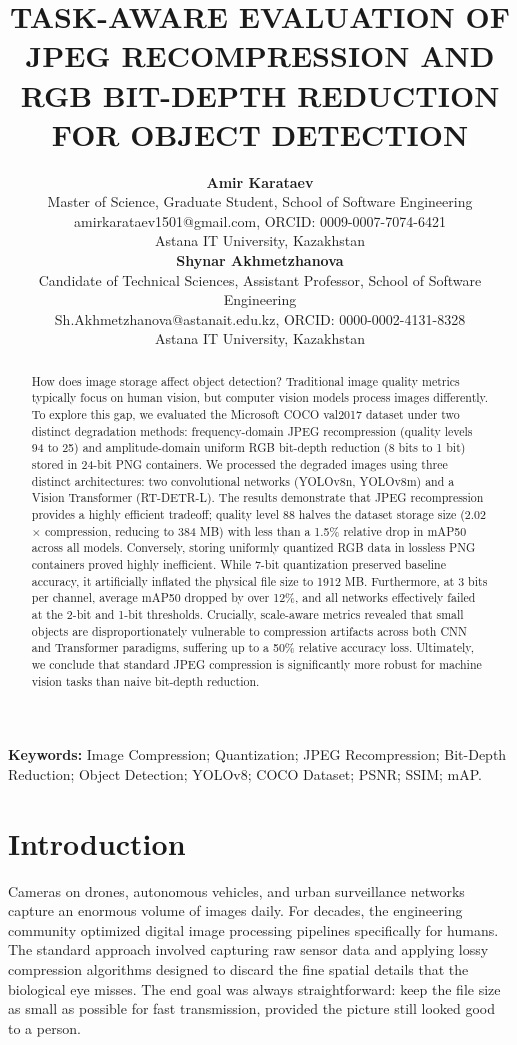 \documentclass[12pt, a4paper]{article}
\title{TASK-AWARE EVALUATION OF JPEG RECOMPRESSION AND RGB BIT-DEPTH REDUCTION FOR OBJECT DETECTION}
\author{
  \textbf{Amir Karataev} \\
  \small Master of Science, Graduate Student, School of Software Engineering \\
  \small amirkarataev1501@gmail.com, ORCID: 0009-0007-7074-6421 \\
  \small Astana IT University, Kazakhstan \\
  \textbf{Shynar Akhmetzhanova} \\
  \small Candidate of Technical Sciences, Assistant Professor, School of Software Engineering \\
  \small Sh.Akhmetzhanova@astanait.edu.kz, ORCID: 0000-0002-4131-8328 \\
  \small Astana IT University, Kazakhstan
}
\date{}
\begin{document}
\maketitle

\begin{abstract}
How does image storage affect object detection? Traditional image quality metrics typically focus on human vision, but computer vision models process images differently. To explore this gap, we evaluated the Microsoft COCO val2017 dataset under two distinct degradation methods: frequency-domain JPEG recompression (quality levels 94 to 25) and amplitude-domain uniform RGB bit-depth reduction (8 bits to 1 bit) stored in 24-bit PNG containers. We processed the degraded images using three distinct architectures: two convolutional networks (YOLOv8n, YOLOv8m) and a Vision Transformer (RT-DETR-L). The results demonstrate that JPEG recompression provides a highly efficient tradeoff; quality level 88 halves the dataset storage size (2.02$\times$ compression, reducing to 384 MB) with less than a 1.5\% relative drop in mAP50 across all models. Conversely, storing uniformly quantized RGB data in lossless PNG containers proved highly inefficient. While 7-bit quantization preserved baseline accuracy, it artificially inflated the physical file size to 1912 MB. Furthermore, at 3 bits per channel, average mAP50 dropped by over 12\%, and all networks effectively failed at the 2-bit and 1-bit thresholds. Crucially, scale-aware metrics revealed that small objects are disproportionately vulnerable to compression artifacts across both CNN and Transformer paradigms, suffering up to a 50\% relative accuracy loss. Ultimately, we conclude that standard JPEG compression is significantly more robust for machine vision tasks than naive bit-depth reduction.
\end{abstract}

\noindent \textbf{Keywords:} Image Compression; Quantization; JPEG Recompression; Bit-Depth Reduction; Object Detection; YOLOv8; COCO Dataset; PSNR; SSIM; mAP.

\section{Introduction}
Cameras on drones, autonomous vehicles, and urban surveillance networks capture an enormous volume of images daily. For decades, the engineering community optimized digital image processing pipelines specifically for humans. The standard approach involved capturing raw sensor data and applying lossy compression algorithms designed to discard the fine spatial details that the biological eye misses. The end goal was always straightforward: keep the file size as small as possible for fast transmission, provided the picture still looked good to a person. 
\end{document}
